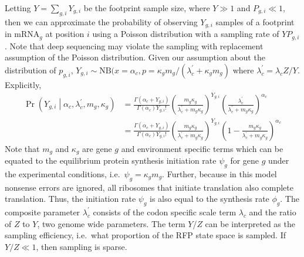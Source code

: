 \documentclass{article}
\newcommand{\alphac}{\ensuremath{{\alpha_c}}\xspace}
\newcommand{\lambdac}{\ensuremath{{\lambda_c}}\xspace}
\newcommand{\lambdacprime}{\ensuremath{{\lambda_c^\prime}}\xspace}
\newcommand{\pgi}{\ensuremath{{p_{g,i}}}\xspace}
\newcommand{\Pgi}{\ensuremath{{P_{g,i}}}\xspace}
\newcommand{\mg}{\ensuremath{{m_g}}\xspace}
\newcommand{\psig}{\ensuremath{{\psi_g}}\xspace}
\newcommand{\phig}{\ensuremath{{\phi_g}}\xspace}
\newcommand{\kappag}{\ensuremath{{\kappa_{g}}}\xspace}
\newcommand{\Ztheta}{\ensuremath{{Z}}\xspace}
\newcommand{\mRNAg}{mRNA$_g$\xspace}
\newcommand{\Ytotal}{\ensuremath{{Y}}\xspace}
\newcommand{\Ygi}{\ensuremath{{Y_{g,i}}}\xspace}
\begin{document}
Letting $\Ytotal = \sum_{g,i}\Ygi$ be the footprint sample size, where $\Ytotal \gg 1$ and $\Pgi \ll 1$, then we can approximate the probability of observing $\Ygi$ samples of a footprint in \mRNAg at position $i$ using a Poisson distribution with a sampling rate of $\Ytotal \Pgi$.
Note that deep sequencing may violate the sampling with replacement assumption of the Poisson distribution.
Given our assumption about the distribution of $\pgi$,  $\Ygi \sim \text{NB}(x = \alphac, p = \kappag \mg /(\lambdacprime + \kappag \mg)$ where $\lambdacprime = \lambdac \Ztheta/\Ytotal$.
Explicitly,
\begin{align}
  \Pr\left(\Ygi \middle| \alphac, \lambdacprime, \mg, \kappag\right) &= \frac{\Gamma\left(\alphac + \Ygi\right)}{\Gamma\left(\alphac\right) \Ygi!} 
  \left(\frac{\mg \kappag}{\lambdacprime + \mg \kappag}\right)^\Ygi \left(\frac{\lambdacprime}{\lambdacprime + \mg \kappag}\right)^\alphac \nonumber\\
  \label{eq:distYgSite}
  &=\frac{\Gamma\left(\alphac + \Ygi\right)}{\Gamma\left(\alphac\right) \Ygi!} 
  \left(\frac{\mg \kappag}{\lambdacprime + \mg \kappag}\right)^\Ygi \left(1-\frac{\mg \kappag}{\lambdacprime + \mg \kappag}\right)^\alphac
\end{align}
Note that $\mg$ and \kappag are gene $g$ and environment specific terms which can be equated to the equilibrium protein synthesis initiation rate $\psig$ for gene $g$ under the experimental conditions, i.e.~$\psig = \kappag \mg$.
Further, because in this model nonsense errors are ignored, all ribosomes that initiate translation also complete translation.
Thus, the initiation rate \psig is also equal to the synthesis rate \phig.
The composite parameter \lambdacprime consists of the codon specific scale term \lambdac and  the ratio of \Ztheta to \Ytotal, two genome wide parameters.
The term \Ytotal/\Ztheta can be interpreted as the sampling efficiency, i.e.~what proportion of the RFP state space is sampled.
If $\Ytotal/\Ztheta \ll 1$, then sampling is sparse.
\end{document}
